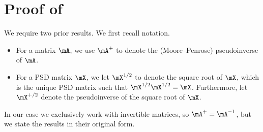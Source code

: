 \documentclass{toc}
\begin{document}
\section{Proof of }\label{sec:goodF}
We require two prior results. We first recall notation.
\begin{itemize}
    \item For a matrix $\mA$, we use $\mA^+$ to denote the (Moore--Penrose) %
    pseudoinverse of $\mA$.  %
    \item For a PSD matrix $\mX$, we let $\mX^{1/2}$ to denote the square root of $\mX$, which is the unique PSD matrix such that $\mX^{1/2}\mX^{1/2}=\mX$. Furthermore, let $\mX^{+/2}$ denote the pseudoinverse  %
    of the square root of $\mX$.
\end{itemize}
In our case we exclusively work with invertible matrices, so $\mA^+=\mA^{-1}$, but we
state the results in their original %
form.  %
  
\end{document}
